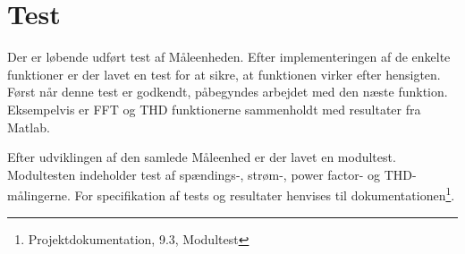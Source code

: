 
\section{Test}

Der er løbende udført test af Måleenheden. Efter implementeringen af de enkelte funktioner er der lavet en test for at sikre, at funktionen virker efter hensigten. Først når denne test er godkendt, påbegyndes arbejdet med den næste funktion. Eksempelvis er FFT og THD funktionerne sammenholdt med resultater fra Matlab. 

Efter udviklingen af den samlede Måleenhed er der lavet en modultest. Modultesten indeholder test af spændings-, strøm-, power factor- og THD-målingerne. For specifikation af tests og resultater henvises til dokumentationen\footnote{Projektdokumentation, 9.3, Modultest}.

